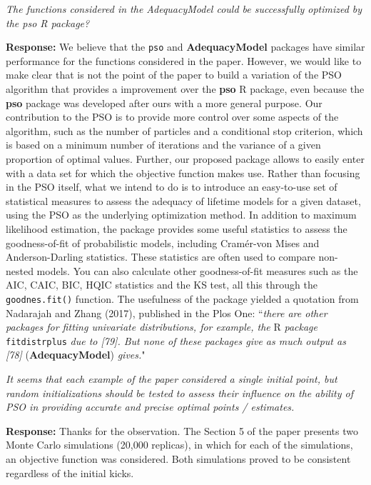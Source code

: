 \documentclass[a4paper,11pt]{exam}
\begin{document}
\begin{questions}
\question \textit{The functions considered in the AdequacyModel could be successfully optimized by the pso R package?}

\noindent \textbf{Response:} We believe that the \texttt{pso} and \textbf{AdequacyModel} packages have similar performance for the functions considered in the paper. However, we would like to make clear that is not the point of the paper to build a variation of the PSO algorithm that provides a improvement over the \textbf{pso} \textsc{R} package, even because the \textbf{pso} package was developed after ours with a more general purpose. Our contribution to the PSO is to provide more control over some aspects of the algorithm, such as the number of particles and a conditional stop criterion, which is based on a minimum number of iterations and the variance of a given proportion of optimal values. Further, our proposed package allows to easily enter with a data set for which the objective function makes use. Rather than focusing in the PSO itself, what we intend to do is to introduce an easy-to-use set of statistical measures to assess the adequacy of lifetime models for a given dataset, using the PSO as the underlying optimization method. In addition to maximum likelihood estimation, the package provides some useful statistics to assess the goodness-of-fit of probabilistic models, including Cramér-von Mises and Anderson-Darling statistics. These statistics are often used to compare non-nested models.  You can also calculate other goodness-of-fit measures such as the AIC, CAIC, BIC, HQIC statistics and the KS test, all this through the \texttt{goodnes.fit()} function. The usefulness of the package yielded a quotation from Nadarajah and Zhang (2017), published in the Plos One: ``{\it there are other packages for fitting univariate distributions, for example, the} \textsc{R} {\it package} \texttt{fitdistrplus} {\it due to [79]. But none of these packages give as much output as [78]} (\textbf{AdequacyModel}) \textit{gives.}"


\question \textit{It seems that each example of the paper considered a single initial point, but random initializations should be tested to assess their influence on the ability of PSO in providing accurate and precise optimal points / estimates.}

\noindent \textbf{Response:} Thanks for the observation. The Section 5 of the paper presents two Monte Carlo simulations (20,000 replicas), in which for each of the simulations, an objective function was considered. Both simulations proved to be consistent regardless of the initial kicks. \\


\end{questions}
\end{document}
